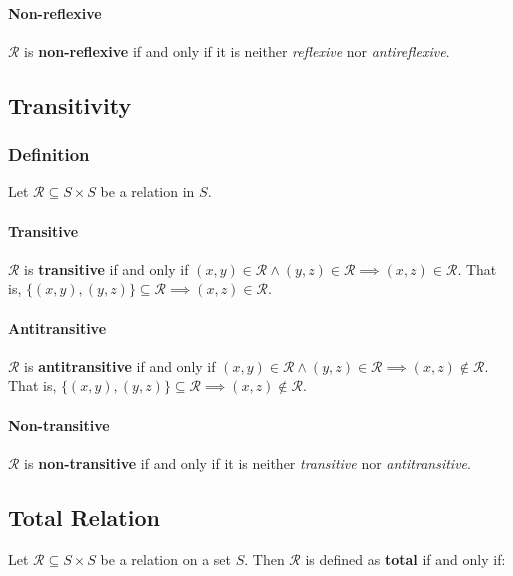 \paragraph{Non-reflexive}

$\mathcal{R}$ is \textbf{non-reflexive} if and only if it is neither
\textit{reflexive} nor \textit{antireflexive}.


\subsection{Transitivity}
\label{sec:transitivity}

\subsubsection{Definition}

Let $\mathcal{R} \subseteq S \times S$ be a relation in $S$.

\paragraph{Transitive}

$\mathcal{R}$ is \textbf{transitive} if and only if
$(x, y) \in \mathcal{R} \land (y, z) \in \mathcal{R} \implies (x, z)
\in \mathcal{R}$. That is,
$\{(x, y), (y, z)\} \subseteq \mathcal{R} \implies (x, z) \in
\mathcal{R}$.

\paragraph{Antitransitive}

$\mathcal{R}$ is \textbf{antitransitive} if and only if
$ (x, y) \in \mathcal{R} \land (y, z) \in \mathcal{R} \implies (x, z)
\notin \mathcal{R}$. That is,
$ \{ (x, y), (y, z) \} \subseteq \mathcal{R} \implies (x, z) \notin
\mathcal{R} $.

\paragraph{Non-transitive}

$\mathcal{R}$ is \textbf{non-transitive} if and only if it is neither
\textit{transitive} nor \textit{antitransitive}.


\subsection{Total Relation}
\label{sec:total-relation}
Let $\mathcal{R} \subseteq S \times S$ be a relation on a set
$S$. Then $\mathcal{R}$ is defined as \textbf{total} if and only if:

